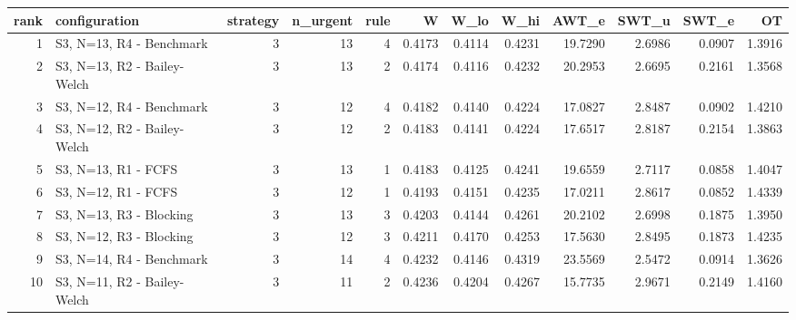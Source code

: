 \begin{tabular}{rlrrrrrrrrrr}
\toprule
rank & configuration & strategy & n_urgent & rule & W & W_lo & W_hi & AWT_e & SWT_u & SWT_e & OT \\
\midrule
1 & S3, N=13, R4 - Benchmark & 3 & 13 & 4 & 0.4173 & 0.4114 & 0.4231 & 19.7290 & 2.6986 & 0.0907 & 1.3916 \\
2 & S3, N=13, R2 - Bailey-Welch & 3 & 13 & 2 & 0.4174 & 0.4116 & 0.4232 & 20.2953 & 2.6695 & 0.2161 & 1.3568 \\
3 & S3, N=12, R4 - Benchmark & 3 & 12 & 4 & 0.4182 & 0.4140 & 0.4224 & 17.0827 & 2.8487 & 0.0902 & 1.4210 \\
4 & S3, N=12, R2 - Bailey-Welch & 3 & 12 & 2 & 0.4183 & 0.4141 & 0.4224 & 17.6517 & 2.8187 & 0.2154 & 1.3863 \\
5 & S3, N=13, R1 - FCFS & 3 & 13 & 1 & 0.4183 & 0.4125 & 0.4241 & 19.6559 & 2.7117 & 0.0858 & 1.4047 \\
6 & S3, N=12, R1 - FCFS & 3 & 12 & 1 & 0.4193 & 0.4151 & 0.4235 & 17.0211 & 2.8617 & 0.0852 & 1.4339 \\
7 & S3, N=13, R3 - Blocking & 3 & 13 & 3 & 0.4203 & 0.4144 & 0.4261 & 20.2102 & 2.6998 & 0.1875 & 1.3950 \\
8 & S3, N=12, R3 - Blocking & 3 & 12 & 3 & 0.4211 & 0.4170 & 0.4253 & 17.5630 & 2.8495 & 0.1873 & 1.4235 \\
9 & S3, N=14, R4 - Benchmark & 3 & 14 & 4 & 0.4232 & 0.4146 & 0.4319 & 23.5569 & 2.5472 & 0.0914 & 1.3626 \\
10 & S3, N=11, R2 - Bailey-Welch & 3 & 11 & 2 & 0.4236 & 0.4204 & 0.4267 & 15.7735 & 2.9671 & 0.2149 & 1.4160 \\
\bottomrule
\end{tabular}
